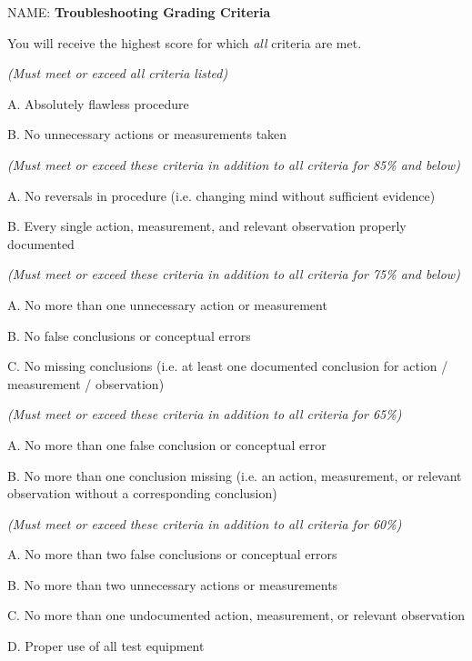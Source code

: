 

\centerline{NAME: \underbar{\hskip 80pt} \hskip 40pt  {\bf Troubleshooting Grading Criteria} }

You will receive the highest score for which {\it all} criteria are met.

\vskip 10pt

\noindent
{} {\it (Must meet or exceed all criteria listed)}
\item{A.} Absolutely flawless procedure
\item{B.} No unnecessary actions or measurements taken
\bigskip



\noindent
{} {\it (Must meet or exceed these criteria in addition to all criteria for 85\% and below)}
\item{A.} No reversals in procedure (i.e. changing mind without sufficient evidence)
\item{B.} Every single action, measurement, and relevant observation properly documented
\bigskip


\noindent
{} {\it (Must meet or exceed these criteria in addition to all criteria for 75\% and below)}
\item{A.} No more than one unnecessary action or measurement
\item{B.} No false conclusions or conceptual errors
\item{C.} No missing conclusions (i.e. at least one documented conclusion for action / measurement / observation)
\bigskip


\noindent
{} {\it (Must meet or exceed these criteria in addition to all criteria for 65\%)}
\item{A.} No more than one false conclusion or conceptual error
\item{B.} No more than one conclusion missing (i.e. an action, measurement, or relevant observation without a corresponding conclusion)
\bigskip


\noindent
{} {\it (Must meet or exceed these criteria in addition to all criteria for 60\%)}
\item{A.} No more than two false conclusions or conceptual errors
\item{B.} No more than two unnecessary actions or measurements
\item{C.} No more than one undocumented action, measurement, or relevant observation
\item{D.} Proper use of all test equipment
\bigskip



